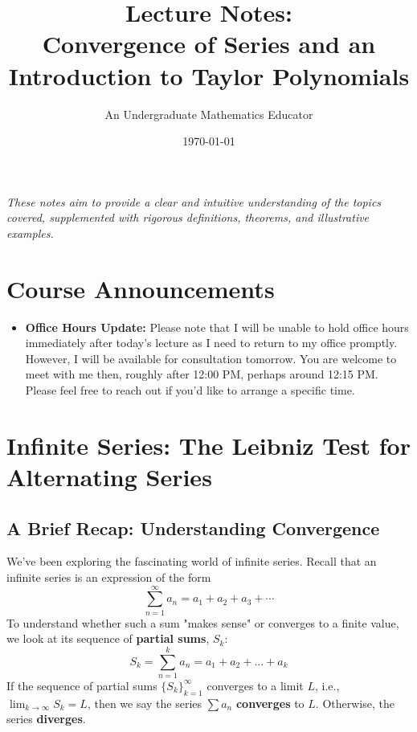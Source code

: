 \documentclass[11pt, a4paper]{article}
\title{Lecture Notes: \\
Convergence of Series and an Introduction to Taylor Polynomials}
\author{An Undergraduate Mathematics Educator}
\date{\today}
\theoremstyle{plain}
\theoremstyle{definition}
\theoremstyle{remark}
\newenvironment{announcement}{%
  \def\FrameCommand{\fboxsep=\FrameSep \fcolorbox{framecolor}{adminlightyellow}}%
  \MakeFramed {\advance\hsize-\width \FrameRestore}%
  \noindent\ignorespaces
}{%
  \endMakeFramed
}
\begin{document}
\maketitle
\begin{center}
    \textit{These notes aim to provide a clear and intuitive understanding of the topics covered, supplemented with rigorous definitions, theorems, and illustrative examples.}
\end{center}
\clearpage
\tableofcontents
\clearpage

\begin{announcement}
\section*{Course Announcements}
\begin{itemize}
    \item \textbf{Office Hours Update:} Please note that I will be unable to hold office hours immediately after today's lecture as I need to return to my office promptly. However, I will be available for consultation tomorrow. You are welcome to meet with me then, roughly after 12:00 PM, perhaps around 12:15 PM. Please feel free to reach out if you'd like to arrange a specific time.
\end{itemize}
\end{announcement}
\clearpage

\section{Infinite Series: The Leibniz Test for Alternating Series}

\subsection{A Brief Recap: Understanding Convergence}

We've been exploring the fascinating world of infinite series. Recall that an infinite series is an expression of the form
\[ \sum_{n=1}^{\infty} a_n = a_1 + a_2 + a_3 + \dotsb \]
To understand whether such a sum "makes sense" or converges to a finite value, we look at its sequence of \textbf{partial sums}, $S_k$:
\[ S_k = \sum_{n=1}^{k} a_n = a_1 + a_2 + \dots + a_k \]
If the sequence of partial sums $\{S_k\}_{k=1}^{\infty}$ converges to a limit $L$, i.e., $\lim_{k \to \infty} S_k = L$, then we say the series $\sum a_n$ \textbf{converges} to $L$. Otherwise, the series \textbf{diverges}.
\end{document}
